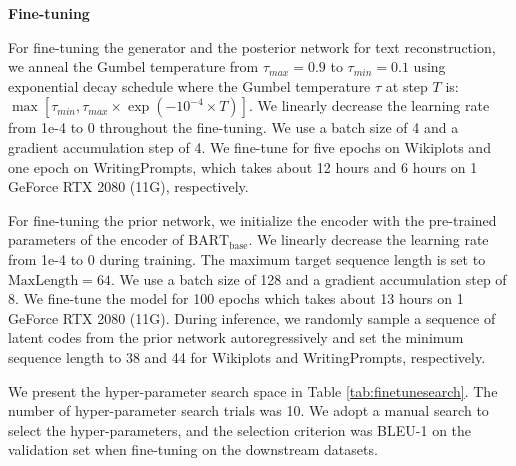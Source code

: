 \documentclass[11pt]{article}
\begin{document}
\noindent\textbf{Fine-tuning}

For fine-tuning the generator and the posterior network for text reconstruction, we anneal the Gumbel temperature from $\tau_{max}=0.9$ to $\tau_{min}=0.1$ using exponential decay schedule where the Gumbel temperature $\tau$ at step $T$ is: $\max[\tau_{min}, \tau_{max}\times \exp(-10^{-4}\times T)]$. We linearly decrease the learning rate from 1e-4 to 0 throughout the fine-tuning. We use a batch size of 4 and a gradient accumulation step of 4. We fine-tune for five epochs on Wikiplots and one epoch on WritingPrompts, which takes about 12 hours and 6 hours on 1 GeForce RTX 2080 (11G), respectively. 

For fine-tuning the prior network, we initialize the encoder with the pre-trained parameters of the encoder of $\text{BART}_{\text{base}}$. We linearly decrease the learning rate from 1e-4 to 0 during training. The maximum target sequence length is set to $\text{MaxLength}=64$. We use a batch size of 128 and a gradient accumulation step of 8. We fine-tune the model for 100 epochs which takes about 13 hours on 1 GeForce RTX 2080 (11G). During inference, we randomly sample a sequence of latent codes from the prior network autoregressively and set the minimum sequence length to 38 and 44 for Wikiplots and WritingPrompts, respectively.

We present the hyper-parameter search space in Table \ref{tab:finetunesearch}. The number of hyper-parameter search trials was 10. We adopt a manual search to select the hyper-parameters, and the selection criterion was BLEU-1 on the validation set when fine-tuning on the downstream datasets.

\begin{table} [!htp]
\centering
\small
{}
\caption{Hyper-parameter search space of \textsc{DiscoDVT} during fine-tuning. \textit{choice} indicates that the listed numbers will be chosen with the same probability.}
\label{tab:finetunesearch}
\end{table}
\end{document}
